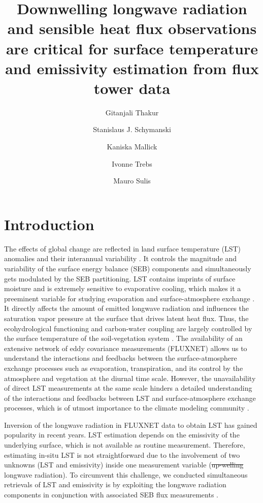 \documentclass[fleqn,10pt]{wlscirep}
\title{Downwelling longwave radiation and sensible heat flux observations are critical for surface temperature and emissivity estimation from flux tower data} %
\author[1,*]{Gitanjali Thakur}
\author[1,*]{ Stanislaus J. Schymanski}
\author[1]{Kaniska Mallick} %
\author[1]{Ivonne Trebs}
\author[1]{Mauro Sulis}
\affil[1]{Environmental Sensing and Modelling unit (ENVISION), Environmental Research and Innovation department (ERIN), Luxembourg Institute of Science and Technology (LIST), Belvaux, Luxembourg} %
\affil[*]{gitanjali.thakur90@gmail.com}
\affil[*]{stanislaus.schymanski@list.lu}
\providecommand{\DIFaddtex}[1]{{\protect\color{blue}\uwave{#1}}} %
\providecommand{\DIFdeltex}[1]{{\protect\color{red}\sout{#1}}}                      %
\providecommand{\DIFaddbegin}{} %
\providecommand{\DIFaddend}{} %
\providecommand{\DIFdelbegin}{} %
\providecommand{\DIFdelend}{} %
\providecommand{\DIFadd}[1]{\texorpdfstring{\DIFaddtex{#1}}{#1}} %
\providecommand{\DIFdel}[1]{\texorpdfstring{\DIFdeltex{#1}}{}} %
\begin{document}
%

\flushbottom
\maketitle
%
%
\thispagestyle{empty}


\section*{Introduction}

The effects of global change are reflected in land surface temperature (LST) anomalies and their interannual variability \cite{rowell2005scenario}. It controls the magnitude and variability of the surface energy balance (SEB) components and simultaneously gets modulated by the SEB partitioning\cite{mallick2015reintroducing,timmermans2007intercomparison}. LST contains imprints of surface moisture and is extremely sensitive to evaporative cooling, which makes it a preeminent variable for studying evaporation and surface-atmosphere exchange \cite{mallick2018critical,trebs2021role,kustas2009advances}. It directly affects the amount of emitted longwave radiation and influences the saturation vapor pressure at the surface that drives latent heat flux. Thus, the ecohydrological functioning and carbon-water coupling are largely controlled by the surface temperature of the soil-vegetation system \cite{still2021imaging}.
The availability of an extensive network of eddy covariance measurements (FLUXNET) allows us to understand the interactions and feedbacks between the surface-atmosphere exchange processes such as evaporation, transpiration, and its control by the atmosphere and vegetation at the diurnal time scale. However, the unavailability of direct LST measurements at the same scale hinders a detailed understanding of the interactions and feedbacks between LST and surface-atmosphere exchange processes, which is of utmost importance to the climate modeling community \cite{migliavacca2021three}.

  Inversion of the longwave radiation in FLUXNET data to obtain LST has gained popularity in recent years. LST estimation depends on the emissivity of the underlying surface\cite{mallick2018bridging}, which is not available as routine measurement. Therefore, estimating in-situ LST is not straightforward due to the involvement of two unknowns (LST and emissivity) inside one measurement variable (\DIFdelbegin \DIFdel{up-welling }\DIFdelend \DIFaddbegin \DIFadd{upwelling }\DIFaddend longwave radiation). To circumvent this challenge, we conducted simultaneous retrievals of LST and emissivity is by exploiting the longwave radiation components in conjunction with associated SEB flux measurements \cite{holmes2009land,maes2019potential}.
\end{document}
